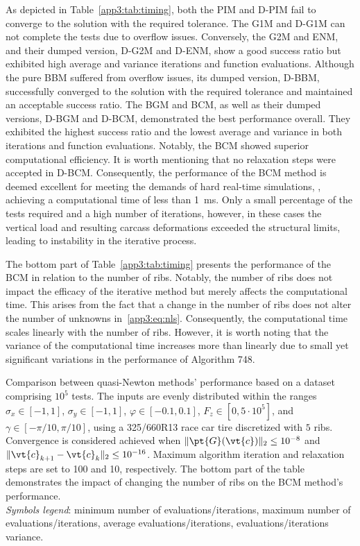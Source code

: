 As depicted in Table~\ref{app3:tab:timing}, both the PIM and D-PIM fail to converge to the solution with the required tolerance. The G1M and D-G1M can not complete the tests due to overflow issues. Conversely, the G2M and ENM, and their dumped version, D-G2M and D-ENM, show a good success ratio but exhibited high average and variance iterations and function evaluations. Although the pure BBM suffered from overflow issues, its dumped version, D-BBM, successfully converged to the solution with the required tolerance and maintained an acceptable success ratio. The BGM and BCM, as well as their dumped versions, D-BGM and D-BCM, demonstrated the best performance overall. They exhibited the highest success ratio and the lowest average and variance in both iterations and function evaluations. Notably, the BCM showed superior computational efficiency. It is worth mentioning that no relaxation steps were accepted in D-BCM. Consequently, the performance of the BCM method is deemed excellent for meeting the demands of hard real-time simulations, \ie{}, achieving a computational time of less than \SI{1}{\milli\second}. Only a small percentage of the tests required and a high number of iterations, however, in these cases the vertical load and resulting carcass deformations exceeded the structural limits, leading to instability in the iterative process.

The bottom part of Table~\ref{app3:tab:timing} presents the performance of the BCM in relation to the number of ribs. Notably, the number of ribs does not impact the efficacy of the iterative method but merely affects the computational time. This arises from the fact that a change in the number of ribs does not alter the number of unknowns in~\eqref{app3:eq:nls}. Consequently, the computational time scales linearly with the number of ribs. However, it is worth noting that the variance of the computational time increases more than linearly due to small yet significant variations in the performance of Algorithm 748.

\begin{table}[htb]
  \centering
  \caption{Comparison between quasi-Newton methods' performance based on a dataset comprising $10^5$ tests. The inputs are evenly distributed within the ranges $\sigma_x \in [-1, 1]$, $\sigma_y \in [-1, 1]$, $\varphi \in [-0.1, 0.1]$, $F_z \in [0, 5\cdot10^5]$, and $\gamma \in [-\pi/10, \pi/10]$, using a 325/660R13 race car tire discretized with $5$ ribs. Convergence is considered achieved when $\|\pt{G}(\vt{c})\|_2 \le 10^{-8}$ and $\|\vt{c}_{k+1} - \vt{c}_{k}\|_2 \le 10^{-16}$. Maximum algorithm iteration and relaxation steps are set to 100 and 10, respectively. The bottom part of the table demonstrates the impact of changing the number of ribs on the BCM method's performance. \\
  \emph{Symbols legend}: \mini{} minimum number of evaluations/iterations, \maxi{} maximum number of evaluations/iterations, \meai{} average evaluations/iterations, \vari{} evaluations/iterations variance.
  }
  \label{app3:tab:timing}
  \small
  
\end{table}

